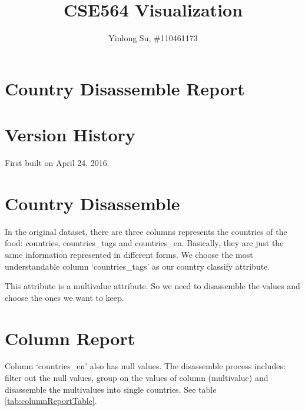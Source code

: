 \documentclass[11pt]{article}
\begin{document}
\title{CSE564 Visualization}
\author{Yinlong Su, \#110461173}
\maketitle

\section*{Country Disassemble Report}

\setcounter{section}{-1}
\section{Version History}

First built on April 24, 2016.

\section{Country Disassemble}

In the original dataset, there are three columns represents the countries of the food: countries, countries\_tags and countries\_en. Basically, they are just the same information represented in different forms. We choose the most understandable column `countries\_tags' as our country classify attribute.
\par
This attribute is a multivalue attribute. So we need to disassemble the values and choose the ones we want to keep.

\section{Column Report}

Column `countries\_en' also has null values. The disassemble process includes: filter out the null values, group on the values of column (multivalue) and disassemble the multivalues into single countries. See table \ref{tab:columnReportTable}.
\end{document}

